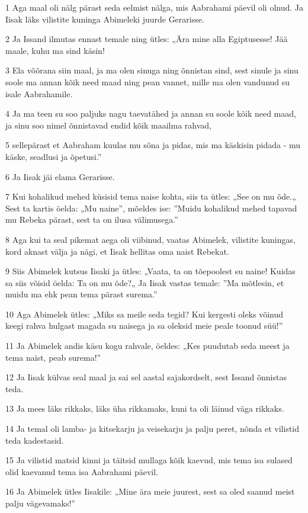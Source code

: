 \par 1 Aga maal oli nälg pärast seda eelmist nälga, mis Aabrahami päevil oli olnud. Ja Iisak läks vilistite kuninga Abimeleki juurde Gerarisse.
\par 2 Ja Issand ilmutas ennast temale ning ütles: „Ära mine alla Egiptusesse! Jää maale, kuhu ma sind käsin!
\par 3 Ela võõrana siin maal, ja ma olen sinuga ning õnnistan sind, sest sinule ja sinu soole ma annan kõik need maad ning pean vannet, mille ma olen vandunud su isale Aabrahamile.
\par 4 Ja ma teen su soo paljuks nagu taevatähed ja annan su soole kõik need maad, ja sinu soo nimel õnnistavad endid kõik maailma rahvad,
\par 5 sellepärast et Aabraham kuulas mu sõna ja pidas, mis ma käskisin pidada - mu käske, seadlusi ja õpetusi.”
\par 6 Ja Iisak jäi elama Gerarisse.
\par 7 Kui kohalikud mehed küsisid tema naise kohta, siis ta ütles: „See on mu õde.„ Sest ta kartis öelda: „Mu naine”, mõeldes ise: ”Muidu kohalikud mehed tapavad mu Rebeka pärast, sest ta on ilusa välimusega.”
\par 8 Aga kui ta seal pikemat aega oli viibinud, vaatas Abimelek, vilistite kuningas, kord aknast välja ja nägi, et Iisak hellitas oma naist Rebekat.
\par 9 Siis Abimelek kutsus Iisaki ja ütles: „Vaata, ta on tõepoolest su naine! Kuidas sa siis võisid öelda: Ta on mu õde?„ Ja Iisak vastas temale: ”Ma mõtlesin, et muidu ma ehk pean tema pärast surema.”
\par 10 Aga Abimelek ütles: „Miks sa meile seda tegid? Kui kergesti oleks võinud keegi rahva hulgast magada su naisega ja sa oleksid meie peale toonud süü!”
\par 11 Ja Abimelek andis käsu kogu rahvale, öeldes: „Kes puudutab seda meest ja tema naist, peab surema!”
\par 12 Ja Iisak külvas seal maal ja sai sel aastal sajakordselt, sest Issand õnnistas teda.
\par 13 Ja mees läks rikkaks, läks üha rikkamaks, kuni ta oli läinud väga rikkaks.
\par 14 Ja temal oli lamba- ja kitsekarju ja veisekarju ja palju peret, nõnda et vilistid teda kadestasid.
\par 15 Ja vilistid matsid kinni ja täitsid mullaga kõik kaevud, mis tema isa sulased olid kaevanud tema isa Aabrahami päevil.
\par 16 Ja Abimelek ütles Iisakile: „Mine ära meie juurest, sest sa oled saanud meist palju vägevamaks!”
